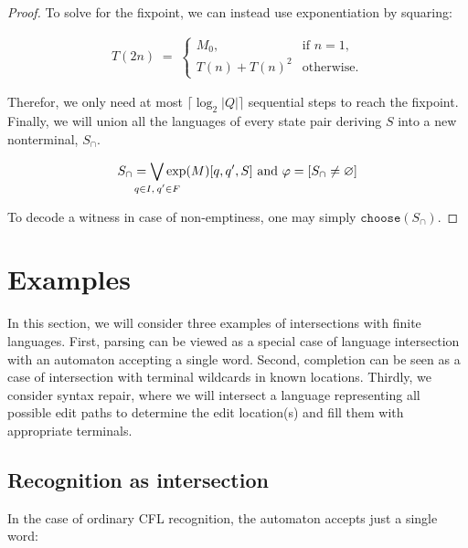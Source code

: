\documentclass[sigplan,review,acmsmall,nonacm,screen,anonymous]{acmart}\settopmatter{printfolios=false,printccs=false,printacmref=false}
\begin{document}
\begin{proof}[Proof]
  \noindent To solve for the fixpoint, we can instead use exponentiation by squaring:

  \begin{align}
    T(2n) \;=\; \begin{cases}
       M_0, & \text{if } n = 1,\\[6pt]
       T(n) + T(n)^2 & \text{otherwise}.
    \end{cases}
  \end{align}

  \noindent Therefor, we only need at most $\lceil\log_2 |Q|\rceil$ sequential steps to reach the fixpoint. Finally, we will union all the languages of every state pair deriving $S$ into a new nonterminal, $S_\cap$.

  \begin{align}
    S_\cap = \bigvee_{\mathclap{q \in I,\:q' \in F}}\exp(M)[q, q', S] \text{ and } \varphi = [S_\cap \neq \varnothing]
  \end{align}

  \noindent To decode a witness in case of non-emptiness, one may simply $\texttt{choose}(S_\cap)$.
\end{proof}\clearpage

\section{Examples}

In this section, we will consider three examples of intersections with finite languages. First, parsing can be viewed as a special case of language intersection with an automaton accepting a single word. Second, completion can be seen as a case of intersection with terminal wildcards in known locations. Thirdly, we consider syntax repair, where we will intersect a language representing all possible edit paths to determine the edit location(s) and fill them with appropriate terminals.

\subsection{Recognition as intersection}

In the case of ordinary CFL recognition, the automaton accepts just a single word:

\begin{figure}[H]
\end{figure}
\end{document}

